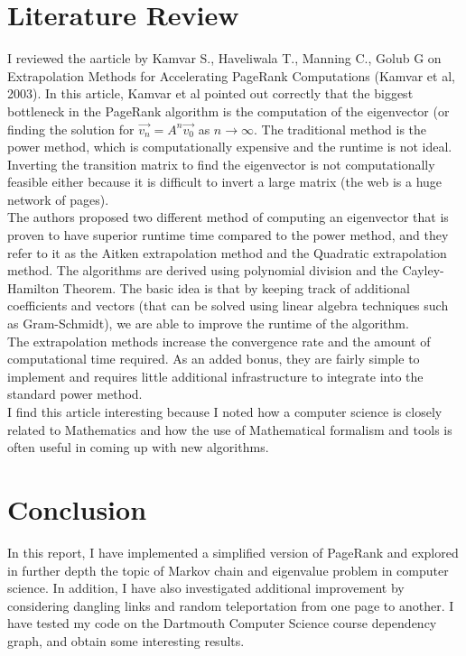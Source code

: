 \documentclass[9.5pt]{extarticle}
\begin{document}
\section{Literature Review}

I reviewed the aarticle by Kamvar S., Haveliwala T., Manning C., Golub G on Extrapolation Methods for Accelerating PageRank Computations (Kamvar et al, 2003). In this article, Kamvar et al pointed out correctly that the biggest bottleneck in the PageRank algorithm is the computation of the eigenvector (or finding the solution for $\vec{v_n} = A^n\vec{v_0}$ as $n \to \infty$. The traditional method is the power method, which is computationally expensive and the runtime is not ideal. Inverting the transition matrix to find the eigenvector is not computationally feasible either because it is difficult to invert a large matrix (the web is a huge network of pages).\\

The authors proposed two different method of computing an eigenvector that is proven to have superior runtime time compared to the power method, and they refer to it as the Aitken extrapolation method and the Quadratic extrapolation method. The algorithms are derived using polynomial division and the Cayley-Hamilton Theorem. The basic idea is that by keeping track of additional coefficients and vectors (that can be solved using linear algebra techniques such as Gram-Schmidt), we are able to improve the runtime of the algorithm.\\

The extrapolation methods increase the convergence rate and the amount of computational time required. As an added bonus, they are fairly simple to implement and requires little additional infrastructure to integrate into the standard power method.\\

I find this article interesting because I noted how a computer science is closely related to Mathematics and how the use of Mathematical formalism and tools is often useful in coming up with new algorithms.



\section{Conclusion}


In this report, I have implemented a simplified version of PageRank and explored in further depth the topic of Markov chain and eigenvalue problem in computer science. In addition, I have also investigated additional improvement by considering dangling links and random teleportation from one page to another. I have tested my code on the Dartmouth Computer Science course dependency graph, and obtain some interesting results. \\
\end{document}
